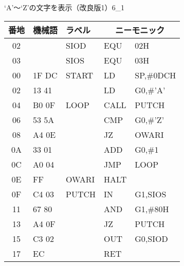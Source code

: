 \begin{figure}[btp]
\begin{reidai}{`A'〜`Z'の文字を表示（改良版1）}{6_1}
\begin{description}
{\tt\footnotesize\begin{center}
\begin{tabular}{|c|l|l|l l|} \hline
番地 & 機械語 & ラベル & \multicolumn{2}{|c|}{ニーモニック} \\
\hline
02 &       & SIOD  & EQU  & 02H             \\
03 &       & SIOS  & EQU  & 03H             \\
00 & 1F DC & START & LD   & SP,\#0DCH       \\
02 & 13 41 &       & LD   & G0,\#'A'        \\
04 & B0 0F & LOOP  & CALL & PUTCH           \\
06 & 53 5A &       & CMP  & G0,\#'Z'        \\
08 & A4 0E &       & JZ   & OWARI           \\
0A & 33 01 &       & ADD  & G0,\#1          \\
0C & A0 04 &       & JMP  & LOOP            \\
0E & FF    & OWARI & HALT &                 \\
0F & C4 03 & PUTCH & IN   & G1,SIOS         \\
11 & 67 80 &       & AND  & G1,\#80H        \\
13 & A4 0F &       & JZ   & PUTCH           \\
15 & C3 02 &       & OUT  & G0,SIOD         \\
17 & EC    &       & RET  &                 \\
\hline
\end{tabular}
\end{center}}
\end{description}
\end{reidai}
\end{figure}


